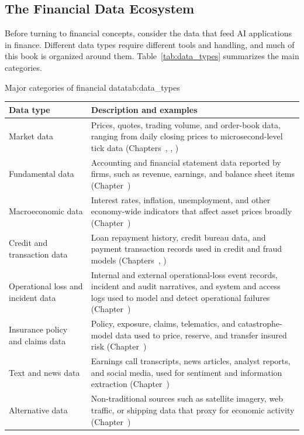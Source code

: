 \documentclass[../ai_in_finance]{subfiles}
\begin{document}
\subsection{The Financial Data Ecosystem}
\label{sec:intro-data-ecosystem}

Before turning to financial concepts, consider the data that feed AI applications in finance. Different data types require different tools and handling, and much of this book is organized around them. Table~\ref{tab:data_types} summarizes the main categories.

\begin{booktable}[htbp]{Major categories of financial data}{tab:data_types}
\begin{tabular}{L{2.6cm}L{9.4cm}}
\toprule
Data type & Description and examples \\
\midrule
Market data & Prices, quotes, trading volume, and order-book data, ranging from daily closing prices to microsecond-level tick data (Chapters~, , ) \\
Fundamental data & Accounting and financial statement data reported by firms, such as revenue, earnings, and balance sheet items (Chapter~) \\
Macroeconomic data & Interest rates, inflation, unemployment, and other economy-wide indicators that affect asset prices broadly (Chapter~) \\
Credit and transaction data & Loan repayment history, credit bureau data, and payment transaction records used in credit and fraud models (Chapters~, ) \\
Operational loss and incident data & Internal and external operational-loss event records, incident and audit narratives, and system and access logs used to model and detect operational failures (Chapter~) \\
Insurance policy and claims data & Policy, exposure, claims, telematics, and catastrophe-model data used to price, reserve, and transfer insured risk (Chapter~) \\
Text and news data & Earnings call transcripts, news articles, analyst reports, and social media, used for sentiment and information extraction (Chapter~) \\
Alternative data & Non-traditional sources such as satellite imagery, web traffic, or shipping data that proxy for economic activity (Chapter~) \\
\bottomrule
\end{tabular}
\end{booktable}
\end{document}
